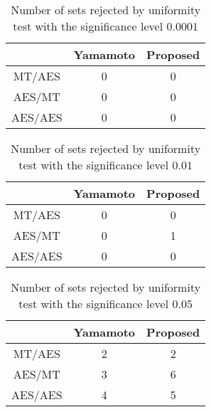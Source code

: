 \documentclass[dvipdfmx,english]{ampmt} %
\begin{document}
\begin{table}[t]
  \centering
  \caption{Number of sets rejected by uniformity test with the significance level $0.0001$}
  \begin{tabular}{ccc} \hline
              & Yamamoto \cite{yamamoto2016highly} & Proposed \\ \hline 
    MT/AES    & 0         & 0        \\
    AES/MT    & 0         & 0        \\
    AES/AES   & 0         & 0        \\ \hline 
  \end{tabular}
  \label{tab:uniformity_1}
\end{table}
\begin{table}[t]
  \centering
  \caption{Number of sets rejected by uniformity test with the significance level $0.01$}
  \begin{tabular}{ccc} \hline
              & Yamamoto \cite{yamamoto2016highly} & Proposed \\ \hline 
    MT/AES    & 0         & 0        \\
    AES/MT    & 0         & 1        \\
    AES/AES   & 0         & 0        \\ \hline 
  \end{tabular}
  \label{tab:uniformity_2}
\end{table}
\begin{table}[t]
  \centering
  \caption{Number of sets rejected by uniformity test with the significance level $0.05$}
  \begin{tabular}{ccc} \hline
              & Yamamoto \cite{yamamoto2016highly} & Proposed \\ \hline 
    MT/AES    & 2         & 2        \\
    AES/MT    & 3         & 6        \\
    AES/AES   & 4         & 5        \\ \hline 
  \end{tabular}
  \label{tab:uniformity_3}
\end{table}
\end{document}
